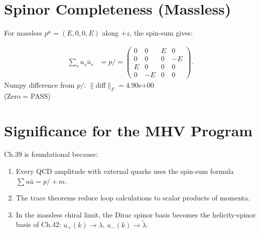 \documentclass[12pt]{article}
\begin{document}
\section{Spinor Completeness (Massless)}\label{sec:spin_completeness}

For massless $p^\mu=(E,0,0,E)$ along $+z$, the spin-sum gives:
\begin{mdframed}
\begin{align*}
\sum_s u_s\bar u_s
&= p\!\!\!/ = \begin{pmatrix}
0&0&E&0\\0&0&0&-E\\E&0&0&0\\0&-E&0&0
\end{pmatrix} .
\end{align*}
Numpy difference from $p\!\!\!/$: $\|$diff$\|_F = $4.90e+00 \\
(Zero = PASS)
\end{mdframed}

\section{Significance for the MHV Program}

Ch.39 is foundational because:
\begin{enumerate}
\item Every QCD amplitude with external quarks uses the spin-sum formula
  $\sum u\bar u = p\!\!\!/+m$.
\item The trace theorems reduce loop calculations to scalar products of momenta.
\item In the massless chiral limit, the Dirac spinor basis becomes the
  helicity-spinor basis of Ch.42: $u_+(k)\to\lambda$, $u_-(k)\to\tilde\lambda$.
\end{enumerate}

\vfill
\end{document}
